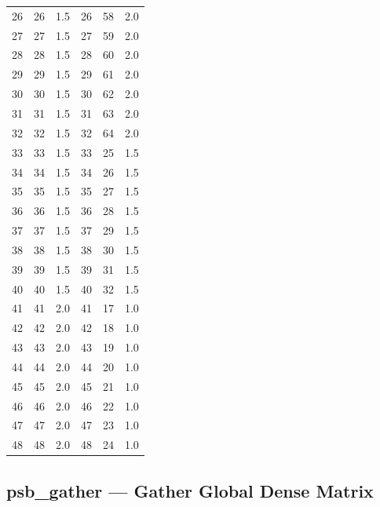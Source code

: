 \begin{table}
\begin{center}
\begin{tabular}{rrr@{\hspace{6\tabcolsep}}rrr}
 26   &   26  &  1.5   &  26  &  58  &   2.0 \\
 27   &   27  &  1.5   &  27  &  59  &   2.0 \\
 28   &   28  &  1.5   &  28  &  60  &   2.0 \\
 29   &   29  &  1.5   &  29  &  61  &   2.0 \\
 30   &   30  &  1.5   &  30  &  62  &   2.0 \\
 31   &   31  &  1.5   &  31  &  63  &   2.0 \\
 32   &   32  &  1.5   &  32  &  64  &   2.0 \\
 33   &   33  &  1.5   &  33  &  25  &   1.5 \\
 34   &   34  &  1.5   &  34  &  26  &   1.5 \\
 35   &   35  &  1.5   &  35  &  27  &   1.5 \\
 36   &   36  &  1.5   &  36  &  28  &   1.5 \\
 37   &   37  &  1.5   &  37  &  29  &   1.5 \\
 38   &   38  &  1.5   &  38  &  30  &   1.5 \\
 39   &   39  &  1.5   &  39  &  31  &   1.5 \\
 40   &   40  &  1.5   &  40  &  32  &   1.5 \\
 41   &   41  &  2.0   &  41  &  17  &   1.0 \\
 42   &   42  &  2.0   &  42  &  18  &   1.0 \\
 43   &   43  &  2.0   &  43  &  19  &   1.0 \\
 44   &   44  &  2.0   &  44  &  20  &   1.0 \\
 45   &   45  &  2.0   &  45  &  21  &   1.0 \\
 46   &   46  &  2.0   &  46  &  22  &   1.0 \\
 47   &   47  &  2.0   &  47  &  23  &   1.0 \\
 48   &   48  &  2.0   &  48  &  24  &   1.0 \\
\end{tabular}
\end{center}
\end{table}



%
%

\clearpage\subsection*{psb\_gather --- Gather Global Dense Matrix}


